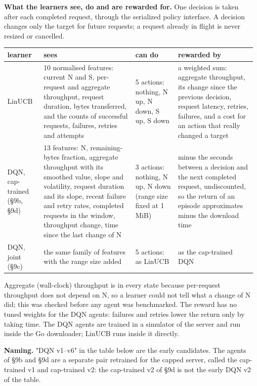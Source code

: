 \documentclass{ieeeaccess}
\begin{document}
\textbf{What the learners see, do and are rewarded for.} One decision is taken after each completed request, through the serialized policy interface. A decision changes only the target for future requests; a request already in flight is never resized or cancelled.


\begin{table}[!t]\centering\footnotesize
\begin{tabularx}{\textwidth}{@{}LLLL@{}}
\toprule
\textbf{learner} & \textbf{sees} & \textbf{can do} & \textbf{rewarded by}\\
\midrule
LinUCB & 10 normalised features: current N and S, per-request and aggregate throughput, request duration, bytes transferred, and the counts of successful requests, failures, retries and attempts & 5 actions: nothing, N up, N down, S up, S down & a weighted sum: aggregate throughput, its change since the previous decision, request latency, retries, failures, and a cost for an action that really changed a target\\
DQN, cap-trained (§9b, §9d) & 13 features: N, remaining-bytes fraction, aggregate throughput with its smoothed value, slope and volatility, request duration and its slope, recent failure and retry rates, completed requests in the window, throughput change, time since the last change of N & 3 actions: nothing, N up, N down (range size fixed at 1 MiB) & minus the seconds between a decision and the next completed request, undiscounted, so the return of an episode approximates minus the download time\\
DQN, joint (§9c) & the same family of features with the range size added & 5 actions: as LinUCB & as the cap-trained DQN\\
\bottomrule
\end{tabularx}
\end{table}


Aggregate (wall-clock) throughput is in every state because per-request throughput does not depend on N, so a learner could not tell what a change of N did; this was checked before any agent was benchmarked. The reward has no tuned weights for the DQN agents: failures and retries lower the return only by taking time. The DQN agents are trained in a simulator of the server and run inside the Go downloader; LinUCB runs inside it directly.


\textbf{Naming.} "DQN v1–v6" in the table below are the early candidates. The agents of §9b and §9d are a separate pair retrained for the capped server, called the cap-trained v1 and cap-trained v2: the cap-trained v2 of §9d is not the early DQN v2 of the table.
\end{document}

